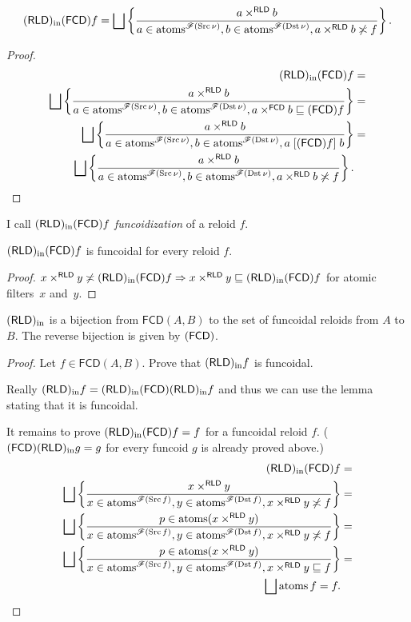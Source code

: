 \begin{prop}
\[
\torldin\tofcd f=\bigsqcup\setcond{a\times^{\mathsf{RLD}}b}{a\in\atoms^{\mathscr{F}(\Src\nu)},b\in\atoms^{\mathscr{F}(\Dst\nu)},a\times^{\mathsf{RLD}}b\nasymp f}.
\]
\end{prop}
\begin{proof}
~
\begin{align*}
\torldin\tofcd f & =\\
\bigsqcup\setcond{a\times^{\mathsf{RLD}}b}{a\in\atoms^{\mathscr{F}(\Src\nu)},b\in\atoms^{\mathscr{F}(\Dst\nu)},a\times^{\mathsf{FCD}}b\sqsubseteq\tofcd f} & =\\
\bigsqcup\setcond{a\times^{\mathsf{RLD}}b}{a\in\atoms^{\mathscr{F}(\Src\nu)},b\in\atoms^{\mathscr{F}(\Dst\nu)},a\suprel{\tofcd f}b} & =\\
\bigsqcup\setcond{a\times^{\mathsf{RLD}}b}{a\in\atoms^{\mathscr{F}(\Src\nu)},b\in\atoms^{\mathscr{F}(\Dst\nu)},a\times^{\mathsf{RLD}}b\nasymp f}.
\end{align*}
\end{proof}
\begin{defn}
I call $(\mathsf{RLD})_{\mathrm{in}}(\mathsf{FCD}) f$ \emph{funcoidization} of a reloid $f$.\end{defn}
\begin{lem}
$(\mathsf{RLD})_{\mathrm{in}}(\mathsf{FCD}) f$ is funcoidal for every reloid $f$.\end{lem}
\begin{proof}
$x\times^{\mathsf{RLD}}y\not\asymp(\mathsf{RLD})_{\mathrm{in}}(\mathsf{FCD}) f\Rightarrow x\times^{\mathsf{RLD}}y\sqsubseteq(\mathsf{RLD})_{\mathrm{in}}(\mathsf{FCD}) f$
for atomic filters~$x$ and~$y$.\end{proof}
\begin{thm}\label{fcdal-bij}
$(\mathsf{RLD})_{\mathrm{in}}$ is a bijection from $\mathsf{FCD}(A,B)$ to the set of
funcoidal reloids from $A$ to $B$. The reverse bijection is given by $(\mathsf{FCD})$.\end{thm}
\begin{proof}
Let $f\in\mathsf{FCD}(A,B)$. Prove that $(\mathsf{RLD})_{\mathrm{in}} f$ is funcoidal.

Really $(\mathsf{RLD})_{\mathrm{in}} f=(\mathsf{RLD})_{\mathrm{in}}(\mathsf{FCD})(\mathsf{RLD})_{\mathrm{in}} f$ and thus we can use
the lemma stating that it is funcoidal.

It remains to prove $(\mathsf{RLD})_{\mathrm{in}}(\mathsf{FCD}) f=f$ for a funcoidal reloid $f$.
($(\mathsf{FCD})(\mathsf{RLD})_{\mathrm{in}} g=g$ for every funcoid $g$ is already proved above.)
\begin{align*}
\torldin\tofcd f & =\\
\bigsqcup\setcond{x\times^{\mathsf{RLD}}y}{x\in\atoms^{\mathscr{F}(\Src f)},y\in\atoms^{\mathscr{F}(\Dst f)},x\times^{\mathsf{RLD}}y\nasymp f} & =\\
\bigsqcup\setcond{p\in\atoms(x\times^{\mathsf{RLD}}y)}{x\in\atoms^{\mathscr{F}(\Src f)},y\in\atoms^{\mathscr{F}(\Dst f)},x\times^{\mathsf{RLD}}y\nasymp f} & =\\
\bigsqcup\setcond{p\in\atoms(x\times^{\mathsf{RLD}}y)}{x\in\atoms^{\mathscr{F}(\Src f)},y\in\atoms^{\mathscr{F}(\Dst f)},x\times^{\mathsf{RLD}}y\sqsubseteq f} & =\\
\bigsqcup\atoms f=f.
\end{align*}
\end{proof}
